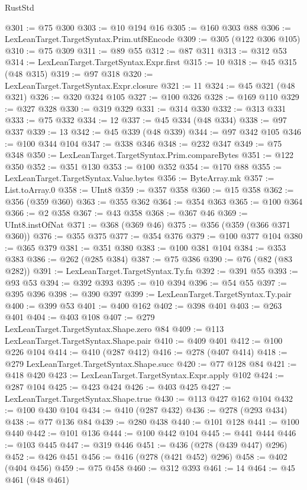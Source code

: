 \begin{lexlean}{RustStd}
\begin{coremodule}
@301 := @75 @300
@303 := @10 @194 @16
@305 := @160 @303 @88
@306 := LexLeanTarget.TargetSyntax.Prim.utf8Encode
@309 := @305 (@122 @306 @105)
@310 := @75 @309
@311 := @89 @55
@312 := @87 @311
@313 := @312 @53
@314 := LexLeanTarget.TargetSyntax.Expr.first
@315 := 10
@318 := @45 @315 (@48 @315)
@319 := @97 @318
@320 := LexLeanTarget.TargetSyntax.Expr.closure
@321 := 11
@324 := @45 @321 (@48 @321)
@326 := @320 @324 @105
@327 := @100 @326
@328 := @169 @110
@329 := @327 @328
@330 := @319 @329
@331 := @314 @330
@332 := @313 @331
@333 := @75 @332
@334 := 12
@337 := @45 @334 (@48 @334)
@338 := @97 @337
@339 := 13
@342 := @45 @339 (@48 @339)
@344 := @97 @342 @105
@346 := @100 @344 @104
@347 := @338 @346
@348 := @232 @347
@349 := @75 @348
@350 := LexLeanTarget.TargetSyntax.Prim.compareBytes
@351 := @122 @350
@352 := @351 @130
@353 := @100 @352
@354 := @170 @88
@355 := LexLeanTarget.TargetSyntax.Value.bytes
@356 := ByteArray.mk
@357 := List.toArray.{0}
@358 := UInt8
@359 := @357 @358
@360 := @15 @358
@362 := @356 (@359 @360)
@363 := @355 @362
@364 := @354 @363
@365 := @100 @364
@366 := @2 @358
@367 := @43 @358
@368 := @367 @46
@369 := UInt8.instOfNat
@371 := @368 (@369 @46)
@375 := @356 (@359 (@366 @371 @360))
@376 := @355 @375
@377 := @354 @376
@379 := @100 @377 @104
@380 := @365 @379
@381 := @351 @380
@383 := @100 @381 @104
@384 := @353 @383
@386 := @262 (@285 @384)
@387 := @75 @386
@390 := @76 (@82 (@83 @282))
@391 := LexLeanTarget.TargetSyntax.Ty.fn
@392 := @391 @55
@393 := @93 @53
@394 := @392 @393
@395 := @10 @394
@396 := @54 @55
@397 := @395 @396
@398 := @390 @397
@399 := LexLeanTarget.TargetSyntax.Ty.pair
@400 := @399 @53
@401 := @400 @162
@402 := @398 @401
@403 := @263 @401
@404 := @403 @108
@407 := @279 LexLeanTarget.TargetSyntax.Shape.zero @84
@409 := @113 LexLeanTarget.TargetSyntax.Shape.pair
@410 := @409 @401
@412 := @100 @226 @104
@414 := @410 (@287 @412)
@416 := @278 (@407 @414)
@418 := @279 LexLeanTarget.TargetSyntax.Shape.succ
@420 := @77 @128 @84
@421 := @418 @420
@423 := LexLeanTarget.TargetSyntax.Expr.apply @102
@424 := @287 @104
@425 := @423 @424
@426 := @403 @425
@427 := LexLeanTarget.TargetSyntax.Shape.true
@430 := @113 @427 @162 @104
@432 := @100 @430 @104
@434 := @410 (@287 @432)
@436 := @278 (@293 @434)
@438 := @77 @136 @84
@439 := @280 @438
@440 := @101 @128
@441 := @100 @440
@442 := @101 @136
@444 := @100 @442 @104
@445 := @441 @444
@446 := @103 @445
@447 := @319 @446
@451 := @436 (@278 (@439 @447) @296)
@452 := @426 @451
@456 := @416 (@278 (@421 @452) @296)
@458 := @402 (@404 @456)
@459 := @75 @458
@460 := @312 @393
@461 := 14
@464 := @45 @461 (@48 @461)

\end{coremodule}
\end{lexlean}
